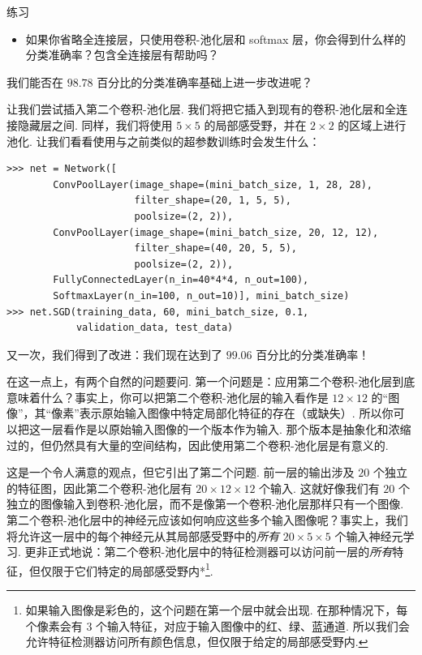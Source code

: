 \begin{exerciseBox}{练习}

\begin{itemize}

\item 如果你省略全连接层，只使用卷积-池化层和 softmax 层，你会得到什么样的分类准确率？包含全连接层有帮助吗？

\end{itemize}

我们能否在 $98.78$ 百分比的分类准确率基础上进一步改进呢？

让我们尝试插入第二个卷积-池化层. 我们将把它插入到现有的卷积-池化层和全连接隐藏层之间. 同样，我们将使用 $5 \times 5$ 的局部感受野，并在 $2 \times 2$ 的区域上进行池化. 让我们看看使用与之前类似的超参数训练时会发生什么：

\begin{lstlisting}
>>> net = Network([
        ConvPoolLayer(image_shape=(mini_batch_size, 1, 28, 28),
                      filter_shape=(20, 1, 5, 5),
                      poolsize=(2, 2)),
        ConvPoolLayer(image_shape=(mini_batch_size, 20, 12, 12),
                      filter_shape=(40, 20, 5, 5),
                      poolsize=(2, 2)),
        FullyConnectedLayer(n_in=40*4*4, n_out=100),
        SoftmaxLayer(n_in=100, n_out=10)], mini_batch_size)
>>> net.SGD(training_data, 60, mini_batch_size, 0.1,
            validation_data, test_data)

\end{lstlisting}

又一次，我们得到了改进：我们现在达到了 $99.06$ 百分比的分类准确率！

在这一点上，有两个自然的问题要问. 第一个问题是：应用第二个卷积-池化层到底意味着什么？事实上，你可以把第二个卷积-池化层的输入看作是 $12 \times 12$ 的``图像''，其``像素''表示原始输入图像中特定局部化特征的存在（或缺失）. 所以你可以把这一层看作是以原始输入图像的一个版本作为输入. 那个版本是抽象化和浓缩过的，但仍然具有大量的空间结构，因此使用第二个卷积-池化层是有意义的.

这是一个令人满意的观点，但它引出了第二个问题. 前一层的输出涉及 $20$ 个独立的特征图，因此第二个卷积-池化层有 $20 \times 12 \times 12$ 个输入. 这就好像我们有 $20$ 个独立的图像输入到卷积-池化层，而不是像第一个卷积-池化层那样只有一个图像. 第二个卷积-池化层中的神经元应该如何响应这些多个输入图像呢？事实上，我们将允许这一层中的每个神经元从其局部感受野中的\emph{所有} $20 \times 5 \times 5$ 个输入神经元学习. 更非正式地说：第二个卷积-池化层中的特征检测器可以访问前一层的\emph{所有}特征，但仅限于它们特定的局部感受野内*\footnote{如果输入图像是彩色的，这个问题在第一个层中就会出现. 在那种情况下，每个像素会有 3 个输入特征，对应于输入图像中的红、绿、蓝通道. 所以我们会允许特征检测器访问所有颜色信息，但仅限于给定的局部感受野内.}.

\end{exerciseBox}

